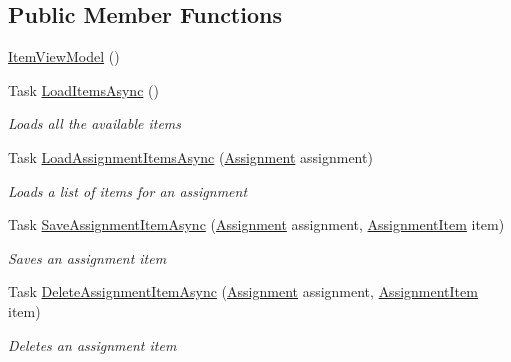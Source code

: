 \subsection*{Public Member Functions}
\begin{DoxyCompactItemize}
\item 
\hyperlink{class_field_service_1_1_view_models_1_1_item_view_model_a4f5022be311f8aa467b11f91e57cadaa}{Item\+View\+Model} ()
\item 
Task \hyperlink{class_field_service_1_1_view_models_1_1_item_view_model_ac15c2d605619c52035a60f92edfbed8c}{Load\+Items\+Async} ()
\begin{DoxyCompactList}\small\item\em Loads all the available items \end{DoxyCompactList}\item 
Task \hyperlink{class_field_service_1_1_view_models_1_1_item_view_model_a2a88d75ca999a85fe345fa2274bf68aa}{Load\+Assignment\+Items\+Async} (\hyperlink{class_field_service_1_1_data_1_1_assignment}{Assignment} assignment)
\begin{DoxyCompactList}\small\item\em Loads a list of items for an assignment \end{DoxyCompactList}\item 
Task \hyperlink{class_field_service_1_1_view_models_1_1_item_view_model_a818404a48afb5afca1e4524ba9549056}{Save\+Assignment\+Item\+Async} (\hyperlink{class_field_service_1_1_data_1_1_assignment}{Assignment} assignment, \hyperlink{class_field_service_1_1_data_1_1_assignment_item}{Assignment\+Item} item)
\begin{DoxyCompactList}\small\item\em Saves an assignment item \end{DoxyCompactList}\item 
Task \hyperlink{class_field_service_1_1_view_models_1_1_item_view_model_aad9649f5286fa6a4bc3a4b14f6732fce}{Delete\+Assignment\+Item\+Async} (\hyperlink{class_field_service_1_1_data_1_1_assignment}{Assignment} assignment, \hyperlink{class_field_service_1_1_data_1_1_assignment_item}{Assignment\+Item} item)
\begin{DoxyCompactList}\small\item\em Deletes an assignment item \end{DoxyCompactList}\end{DoxyCompactItemize}

